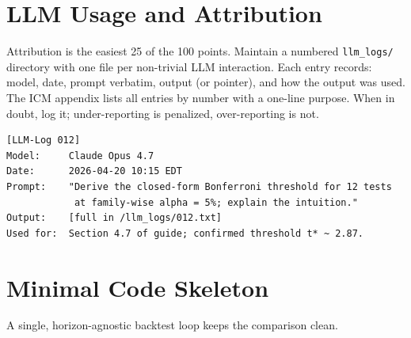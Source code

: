 \documentclass[11pt,letterpaper]{article}
\begin{document}
\section{LLM Usage and Attribution}\label{sec:attribution}

Attribution is the easiest 25 of the 100 points. Maintain a numbered \texttt{llm\_logs/} directory with one file per non-trivial LLM interaction. Each entry records: model, date, prompt verbatim, output (or pointer), and how the output was used. The ICM appendix lists all entries by number with a one-line purpose. When in doubt, log it; under-reporting is penalized, over-reporting is not.

\begin{lstlisting}[basicstyle=\ttfamily\footnotesize]
[LLM-Log 012]
Model:     Claude Opus 4.7
Date:      2026-04-20 10:15 EDT
Prompt:    "Derive the closed-form Bonferroni threshold for 12 tests
            at family-wise alpha = 5%; explain the intuition."
Output:    [full in /llm_logs/012.txt]
Used for:  Section 4.7 of guide; confirmed threshold t* ~ 2.87.
\end{lstlisting}

\section{Minimal Code Skeleton}\label{sec:code}

A single, horizon-agnostic backtest loop keeps the comparison clean.
\end{document}
